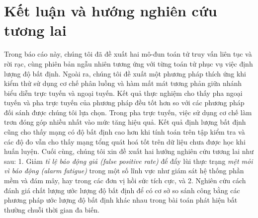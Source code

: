\chapter{Kết luận và hướng nghiên cứu tương lai}
\label{Chapter5}

Trong báo cáo này, chúng tôi đã đề xuất hai mô-đun toán tử truy vấn liên tục và rời rạc, cùng phiên bản ngẫu nhiên tương ứng với từng toán tử phục vụ việc định lượng độ bất định. Ngoài ra, chúng tôi đề xuất một phương pháp thích ứng khi kiểm thử sử dụng cơ chế phân luồng và hàm mất mát tương phản giữa nhánh biểu diễn trực tuyến và ngoại tuyến. Kết quả thực nghiệm cho thấy pha ngoại tuyến và pha trực tuyến của phương pháp đều tốt hơn so với các phương pháp đối sánh được chúng tôi lựa chọn. Trong pha trực tuyến, việc sử dụng cơ chế làm trơn đóng góp nhiều nhất vào mức tăng hiệu quả. Kết quả định lượng bất định cũng cho thấy mạng có độ bất định cao hơn khi tính toán trên tập kiểm tra và các độ đo vẫn cho thấy mạng tổng quát hoá tốt trên dữ liệu chưa được học khi huấn luyện. Cuối cùng, chúng tôi xin đề xuất hai hướng nghiên cứu tương lai như sau:
1. Giảm \textit{tỉ lệ báo động giả (false positive rate)} để đẩy lùi thực trạng \textit{mệt mỏi vì báo động (alarm fatigue)} trong một số lĩnh vực như giám sát hệ thống phần mềm và đám mây, hay trong các đơn vị hồi sức tích cực, và 
2. Nghiên cứu cách đánh giá chất lượng ước lượng độ bất định để có cơ sở so sánh công bằng các phương pháp ước lượng độ bất định khác nhau trong bài toán phát hiện bất thường chuỗi thời gian đa biến.